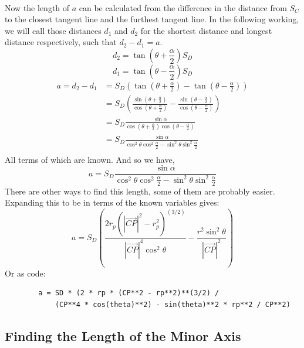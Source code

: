 \documentclass{article}
\newcommand\cpv{\overrightarrow{CP}\xspace}
\begin{document}
	\paragraph{}
	Now the length of $a$ can be calculated from the difference in the distance from $S_C$ to the closest tangent line and the furthest tangent 	line. In the following working, we will call those distances $d_1$ and $d_2$ for the shortest distance and longest distance respectively,
	such that $d_2 - d_1 = a$.
	$$  d_2 =  \tan{\left(\theta + \frac{\alpha}{2}\right)} S_D $$
	$$  d_1 =  \tan{\left(\theta - \frac{\alpha}{2}\right)} S_D $$
	\begin{align*}
		a = d_2 - d_1 & = S_D \left(\tan{\left(\theta + \frac{\alpha}{2}\right)} - \tan{\left(\theta - \frac{\alpha}{2}\right)} \right) \\
		& = S_D\left(\frac{\sin{\left(\theta + \frac{\alpha}{2}\right)}}{\cos{\left(\theta + \frac{\alpha}{2}\right)}}
				    - \frac{\sin{\left(\theta - \frac{\alpha}{2}\right)}}{\cos{\left(\theta - \frac{\alpha}{2}\right)}}\right)    \\
		& = S_D \frac{\sin{\alpha}}{\cos{\left(\theta + \frac{\alpha}{2}\right)} \cos{\left(\theta - \frac{\alpha}{2}\right)}} \\
		& = S_D \frac{\sin{\alpha}}{\cos^2{\theta} \cos^2{\frac{\alpha}{2}} - \sin^2{\theta} \sin^2{\frac{\alpha}{2}}} \\
	\end{align*}
	All terms of which are known. And so we have,
	\begin{equation}
		a =  S_D \frac{\sin{\alpha}}{\cos^2{\theta} \cos^2{\frac{\alpha}{2}} - \sin^2{\theta} \sin^2{\frac{\alpha}{2}}}
	\end{equation}
	There are other ways to find this length, some of them are probably easier. Expanding this to be in terms of the known variables gives:
	\begin{equation*}
		a = S_D  \left(\frac{2 r_p \left(\left|\cpv\right|^2-r_p^2\right)^{(3/2)}}{\left|\cpv\right|^4  \cos^2{\theta}}-
		\frac{r^2 \sin^2{\theta}}{\left|\cpv\right|^2}\right)
	\end{equation*}
	Or as code:
	\begin{verbatim}
		a = SD * (2 * rp * (CP**2 - rp**2)**(3/2) /
		    (CP**4 * cos(theta)**2) - sin(theta)**2 * rp**2 / CP**2)
	\end{verbatim}

	\subsection{Finding the Length of the Minor Axis}
\end{document}
